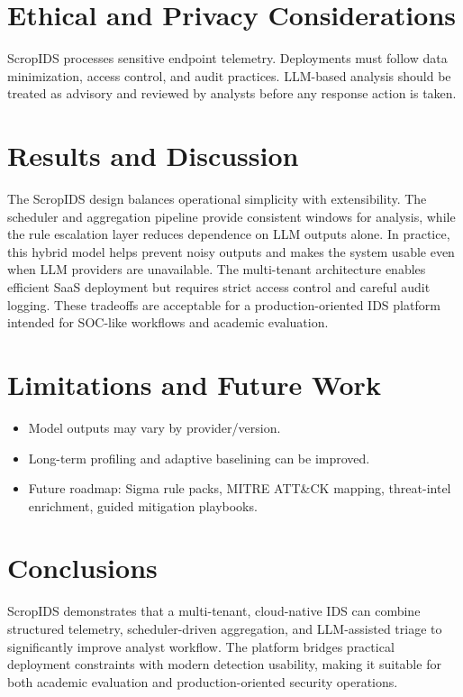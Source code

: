 \documentclass[conference]{IEEEtran}
\begin{document}
\section{Ethical and Privacy Considerations}
ScropIDS processes sensitive endpoint telemetry. Deployments must follow data minimization, access control, and audit practices. LLM-based analysis should be treated as advisory and reviewed by analysts before any response action is taken.

\section{Results and Discussion}
The ScropIDS design balances operational simplicity with extensibility. The scheduler and aggregation pipeline provide consistent windows for analysis, while the rule escalation layer reduces dependence on LLM outputs alone. In practice, this hybrid model helps prevent noisy outputs and makes the system usable even when LLM providers are unavailable. The multi-tenant architecture enables efficient SaaS deployment but requires strict access control and careful audit logging. These tradeoffs are acceptable for a production-oriented IDS platform intended for SOC-like workflows and academic evaluation.

\section{Limitations and Future Work}
\begin{itemize}[leftmargin=1.2em]
    \item Model outputs may vary by provider/version.
    \item Long-term profiling and adaptive baselining can be improved.
    \item Future roadmap: Sigma rule packs, MITRE ATT\&CK mapping, threat-intel enrichment, guided mitigation playbooks.
\end{itemize}

\section{Conclusions}
ScropIDS demonstrates that a multi-tenant, cloud-native IDS can combine structured telemetry, scheduler-driven aggregation, and LLM-assisted triage to significantly improve analyst workflow. The platform bridges practical deployment constraints with modern detection usability, making it suitable for both academic evaluation and production-oriented security operations.
\end{document}
